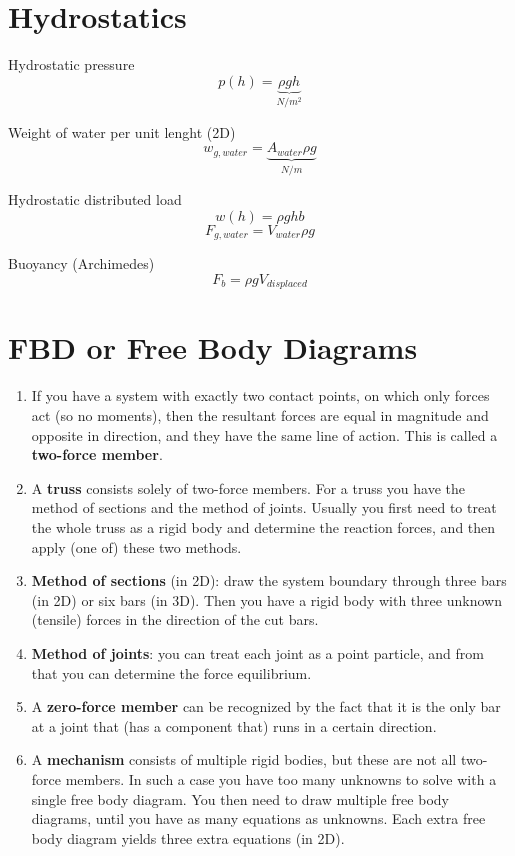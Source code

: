 \documentclass[11pt, titlepage]{article} %
\begin{document}
\section{Hydrostatics}
Hydrostatic pressure
\[p(h) = \underbrace{\rho g h}_{N/m^2}\]

Weight of water per unit lenght (2D)
\[w_{g, water}= \underbrace{A_{water}\rho g }_{N/m}\]

Hydrostatic distributed load
\[w(h) = \rho g h b\]
\[F_{g, water} = V_{water} \rho g\]

Buoyancy (Archimedes)
\[F_b = \rho g V_{displaced}\]

\newpage
\section{FBD or Free Body Diagrams}
\begin{enumerate}
    \item If you have a system with exactly two contact points, on which only forces act (so no moments), then the resultant forces are equal in magnitude and opposite in direction, and they have the same line of action. This is called a \textbf{two-force member}.
    \item A \textbf{truss} consists solely of two-force members. For a truss you have the method of sections and the method of joints. Usually you first need to treat the whole truss as a rigid body and determine the reaction forces, and then apply (one of) these two methods.
    \item \textbf{Method of sections} (in 2D): draw the system boundary through three bars (in 2D) or six bars (in 3D). Then you have a rigid body with three unknown (tensile) forces in the direction of the cut bars.
    \item \textbf{Method of joints}: you can treat each joint as a point particle, and from that you can determine the force equilibrium.
    \item A \textbf{zero-force member} can be recognized by the fact that it is the only bar at a joint that (has a component that) runs in a certain direction.
    \item A \textbf{mechanism} consists of multiple rigid bodies, but these are not all two-force members. In such a case you have too many unknowns to solve with a single free body diagram. You then need to draw multiple free body diagrams, until you have as many equations as unknowns. Each extra free body diagram yields three extra equations (in 2D).
\end{enumerate}
\end{document}
